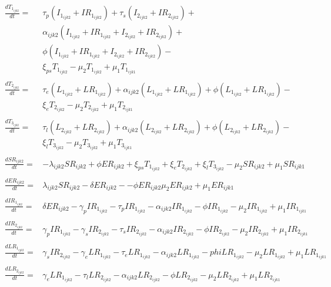 \documentclass[a4paper]{article}
\begin{document}
 \begin{equation*}\label{agecat2-2}
 	\begin{aligned}
    \frac{dT_{1_{ijk2}}}{dt}={} & \tau_p (I_{1_{ijk2}} + IR_{1_{ijk2}} ) + \tau_s (I_{2_{ijk2}} + IR_{2_{ijk2}} ) + \\
    & \alpha_{ijk2} (I_{1_{ijk2}} + IR_{1_{ijk2}} + I_{2_{ijk2}} + IR_{2_{ijk2}}) + \\
    & \phi (I_{1_{ijk2}} + IR_{1_{ijk2}} + I_{2_{ijk2}} + IR_{2_{ijk2}}) - \\
    & \xi_{ps} T_{1_{ijk2}} - \mu_2 T_{1_{ijk2}} + \mu_1 T_{1_{ijk1}}
     \\&\\
    \frac{dT_{2_{ijk2}}}{dt}={} & \tau_e (L_{1_{ijk2}} + LR_{1_{ijk2}})  + \alpha_{ijk2} (L_{1_{ijk2}} + LR_{1_{ijk2}} ) +\phi (L_{1_{ijk2}} + LR_{1_{ijk2}} ) - \\
    & \xi_e T_{2_{ijk2}} - \mu_2 T_{2_{ijk2}} + \mu_1 T_{2_{ijk1}}
     \\&\\
    \frac{dT_{3_{ijk2}}}{dt}={} & \tau_l (L_{2_{ijk2}} + LR_{2_{ijk2}})  + \alpha_{ijk2} (L_{2_{ijk2}} + LR_{2_{ijk2}} ) +\phi (L_{2_{ijk2}} + LR_{2_{ijk2}} ) - \\
    & \xi_l T_{3_{ijk2}} - \mu_2 T_{3_{ijk2}} + \mu_1 T_{3_{ijk1}}
    \\&\\
      \frac{dSR_{ijk2}}{dt}={} & -\lambda_{ijk2} SR_{ijk2} + \phi ER_{ijk2} + \xi_{ps} T_{1_{ijk2}} + \xi_e T_{2_{ijk2}} + \xi_l T_{3_{ijk2}}  - \mu_2 SR_{ijk2} +  \mu_1 SR_{ijk1}
   \\&\\
   \frac{dER_{ijk2}}{dt}={} & \lambda_{ijk2} SR_{ijk2} - \delta ER_{ijk2} - -\phi ER_{ijk2} \mu_2 ER_{ijk2} +  \mu_1 ER_{ijk1}
     \\&\\
  \frac{dIR_{1_{ijk2}}}{dt}={} & \delta ER_{ijk2} - \gamma_p IR_{1_{ijk2}} - \tau_p IR_{1_{ijk2}} - \alpha_{ijk2} IR_{1_{ijk2}} -\phi IR_{1_{ijk2}}  - \mu_2 IR_{1_{ijk2}} + \mu_1 IR_{1_{ijk1}}
   \\&\\
  \frac{dIR_{2_{ijk2}}}{dt}={} & \gamma_p IR_{1_{ijk2}} - \gamma_s IR_{2_{ijk2}} - \tau_s IR_{2_{ijk2}} - \alpha_{ijk2} IR_{2_{ijk2}} -\phi IR_{2_{ijk2}} - \mu_2 IR_{2_{ijk2}} + \mu_1 IR_{2_{ijk1}}
     \\&\\
   \frac{dLR_{1_{ijk2}}}{dt}={} & \gamma_s IR_{2_{ijk2}} - \gamma_e LR_{1_{ijk2}} - \tau_e LR_{1_{ijk2}} - \alpha_{ijk2} LR_{1_{ijk2}} -phi LR_{1_{ijk2}}  - \mu_2 LR_{1_{ijk2}} + \mu_1 LR_{1_{ijk1}}
     \\&\\
    \frac{dLR_{2_{ijk2}}}{dt}={} & \gamma_e LR_{1_{ijk2}} - \tau_l LR_{2_{ijk2}} - \alpha_{ijk2} LR_{2_{ijk2}} -\phi LR_{2_{ijk2}} - \mu_2 LR_{2_{ijk2}} + \mu_1 LR_{2_{ijk1}}
\end{aligned}
\end{equation*}
\end{document}

